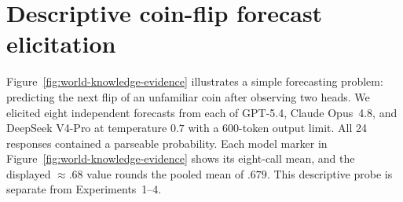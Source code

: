 




\endgroup

\clearpage
\section{Descriptive coin-flip forecast elicitation}
\label{app:carnival-coin-probe}

Figure~\ref{fig:world-knowledge-evidence} illustrates a simple forecasting problem: predicting the next flip of an unfamiliar coin after observing two heads.
We elicited eight independent forecasts from each of GPT-5.4, Claude Opus~4.8, and DeepSeek V4-Pro at temperature $0.7$ with a 600-token output limit.
All 24 responses contained a parseable probability.
Each model marker in Figure~\ref{fig:world-knowledge-evidence} shows its eight-call mean, and the displayed $\approx .68$ value rounds the pooled mean of $.679$.
This descriptive probe is separate from Experiments~1--4.

